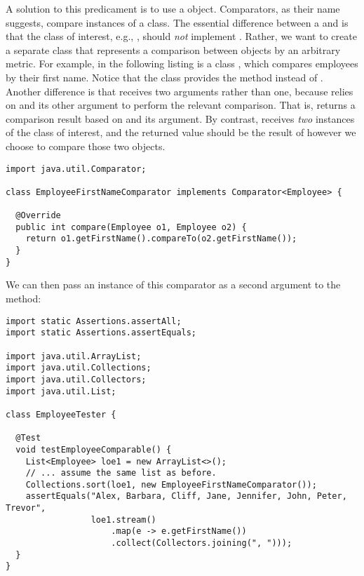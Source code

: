 A solution to this predicament is to use a  object. 
Comparators, as their name suggests, compare instances of a class. 
The essential difference between a  and  is that the class of interest, e.g., , should \emph{not} implement . 
Rather, we want to create a separate class that represents a comparison between  objects by an arbitrary metric. 
For example, in the following listing is a class , which compares employees by their first name. 
Notice that the  class provides the  method instead of . 
Another difference is that  receives two arguments rather than one, because  relies on  and its other argument to perform the relevant comparison. 
That is,  returns a comparison result based on  and its argument. 
By contrast,  receives \emph{two} instances of the class of interest, and the returned value should be the result of however we choose to compare those two objects.

\begin{lstlisting}[language=MyJava]
import java.util.Comparator;

class EmployeeFirstNameComparator implements Comparator<Employee> {

  @Override
  public int compare(Employee o1, Employee o2) {
    return o1.getFirstName().compareTo(o2.getFirstName());
  }
}
\end{lstlisting}

We can then pass an instance of this comparator as a second argument to the  method:

\begin{lstlisting}[language=MyJava]
import static Assertions.assertAll;
import static Assertions.assertEquals;

import java.util.ArrayList;
import java.util.Collections;
import java.util.Collectors;
import java.util.List;

class EmployeeTester {

  @Test
  void testEmployeeComparable() {
    List<Employee> loe1 = new ArrayList<>();
    // ... assume the same list as before.
    Collections.sort(loe1, new EmployeeFirstNameComparator());
    assertEquals("Alex, Barbara, Cliff, Jane, Jennifer, John, Peter, Trevor",
                 loe1.stream()
                     .map(e -> e.getFirstName())
                     .collect(Collectors.joining(", ")));
  }
}
\end{lstlisting}

